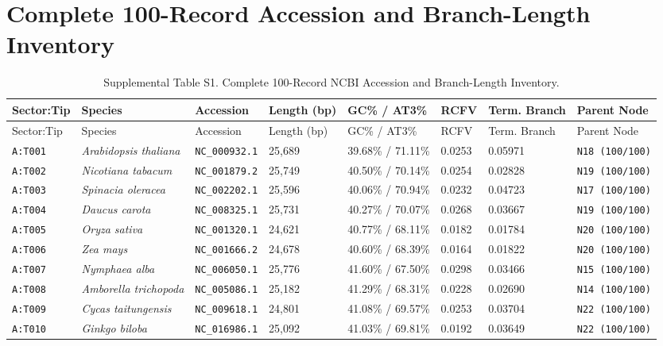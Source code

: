 \documentclass[10pt,letterpaper]{article}
\begin{document}
\section{Complete 100-Record Accession and Branch-Length Inventory}
\footnotesize
\begin{longtable}{llllllll}
\caption{Supplemental Table S1. Complete 100-Record NCBI Accession and Branch-Length Inventory.} \\
\toprule
Sector:Tip & Species & Accession & Length (bp) & GC\% / AT3\% & RCFV & Term. Branch & Parent Node \\
\midrule
\endfirsthead
\toprule
Sector:Tip & Species & Accession & Length (bp) & GC\% / AT3\% & RCFV & Term. Branch & Parent Node \\
\midrule
\endhead
\texttt{A:T001} & \textit{Arabidopsis thaliana} & \texttt{NC\_000932.1} & 25,689 & 39.68\% / 71.11\% & 0.0253 & 0.05971 & \texttt{N18 (100/100)} \\
\texttt{A:T002} & \textit{Nicotiana tabacum} & \texttt{NC\_001879.2} & 25,749 & 40.50\% / 70.14\% & 0.0254 & 0.02828 & \texttt{N19 (100/100)} \\
\texttt{A:T003} & \textit{Spinacia oleracea} & \texttt{NC\_002202.1} & 25,596 & 40.06\% / 70.94\% & 0.0232 & 0.04723 & \texttt{N17 (100/100)} \\
\texttt{A:T004} & \textit{Daucus carota} & \texttt{NC\_008325.1} & 25,731 & 40.27\% / 70.07\% & 0.0268 & 0.03667 & \texttt{N19 (100/100)} \\
\texttt{A:T005} & \textit{Oryza sativa} & \texttt{NC\_001320.1} & 24,621 & 40.77\% / 68.11\% & 0.0182 & 0.01784 & \texttt{N20 (100/100)} \\
\texttt{A:T006} & \textit{Zea mays} & \texttt{NC\_001666.2} & 24,678 & 40.60\% / 68.39\% & 0.0164 & 0.01822 & \texttt{N20 (100/100)} \\
\texttt{A:T007} & \textit{Nymphaea alba} & \texttt{NC\_006050.1} & 25,776 & 41.60\% / 67.50\% & 0.0298 & 0.03466 & \texttt{N15 (100/100)} \\
\texttt{A:T008} & \textit{Amborella trichopoda} & \texttt{NC\_005086.1} & 25,182 & 41.29\% / 68.31\% & 0.0228 & 0.02690 & \texttt{N14 (100/100)} \\
\texttt{A:T009} & \textit{Cycas taitungensis} & \texttt{NC\_009618.1} & 24,801 & 41.08\% / 69.57\% & 0.0253 & 0.03704 & \texttt{N22 (100/100)} \\
\texttt{A:T010} & \textit{Ginkgo biloba} & \texttt{NC\_016986.1} & 25,092 & 41.03\% / 69.81\% & 0.0192 & 0.03649 & \texttt{N22 (100/100)} \\

\end{longtable}
\end{document}
